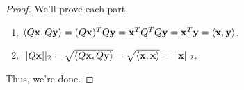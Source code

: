 \documentclass[letterpaper]{article}
\newcommand{\0}{\mathbf{0}}
\newcommand{\y}{\mathbf{y}}
\newcommand{\x}{\mathbf{x}}
\begin{document}
\begin{proof}
    We'll prove each part. 
    \begin{enumerate}
        \item $\cyclic{Q\x, Q\y} = (Q\x)^T Q\y = \x^T Q^T Q \y = \x^T \y = \cyclic{\x, \y}$. 
        \item $||Q\x||_2 = \sqrt{\cyclic{Q\x, Q\y}} = \sqrt{\cyclic{\x, \x}} = ||\x||_2$. 
    \end{enumerate}
    Thus, we're done.
\end{proof}
\end{document}
